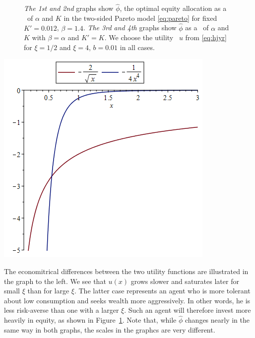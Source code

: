 \begin{figure}[htb!]
\begin{minipage}{0.25\linewidth}
  \end{minipage}
 \caption{
   {\em The 1st and 2nd} graphs show $\hat\phi$, the optimal equity
   allocation as a \fct\ of $\alpha$ and $K$ in the two-sided Pareto model
   \eqref{eq:pareto} for fixed $K'=0.012$, $\beta = 1.4$.
   {\em The 3rd and 4th} graphs show $\hat\phi$ as a \fct\ of $\alpha$
   and $K$ with $\beta = \alpha$ and $K' = K$.
   We choose the utility \fct\ $u$ from \eqref{eq:hjyr} for $\xi = 1/2$
   and $\xi = 4$, $b = 0.01$ in all cases.
  }
  \label{fig:phi_hat_pareto}
\end{figure}

\begin{minipage}{0.5\linewidth}
  \includegraphics[width=\textwidth]{power_utilities.png}
\end{minipage}\hfill
\begin{minipage}{0.42\textwidth}
  The economitrical differences between the two utility functions
  are illustrated in the graph to the left.
  We see that
  $u(x)$ grows slower and saturates later for small $\xi$ than for
  large $\xi$. The latter case represents an agent who is more
  tolerant about low consumption and seeks wealth more
  aggressively. In other words, he is less risk-averse than one with a
  larger $\xi$. Such an agent will therefore invest more heavily in
  equity, as shown in Figure~\ref{fig:phi_hat_pareto}. Note that,
  while $\hat \phi$ changes nearly in the same way in both graphs, the
  scales in the graphcs are very different.
\end{minipage}

